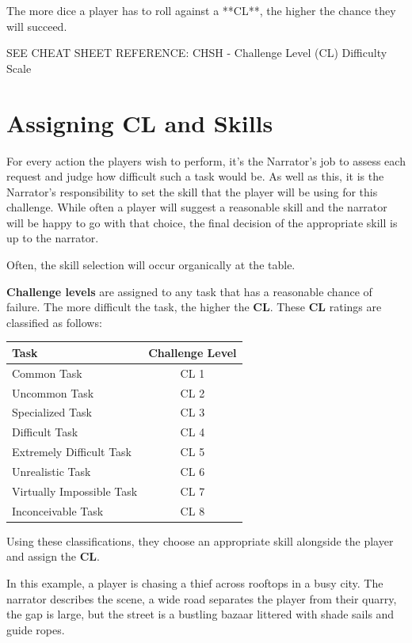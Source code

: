 The more dice a player has to roll against a **CL**, the higher the chance they will succeed.

SEE CHEAT SHEET REFERENCE: CHSH - Challenge Level (CL) Difficulty Scale

\section{Assigning CL and Skills} \label{sec:assigning_cl_and_skills}

For every action the players wish to perform, it’s the Narrator’s job to assess each request and judge how difficult such a task would be. As well as this, it is the Narrator’s responsibility to set the skill that the player will be using for this challenge. While often a player will suggest a reasonable skill and the narrator will be happy to go with that choice, the final decision of the appropriate skill is up to the narrator.  

Often, the skill selection will occur organically at the table.

\textbf{Challenge levels} are assigned to any task that has a reasonable chance of failure. The more difficult the task, the higher the \textbf{CL}. These \textbf{CL} ratings are classified as follows:

\begin{center}
    \begin{xltabular}{0.5\textwidth}{|l|c|} 
        \hline 
        \textbf{Task} & \textbf{Challenge Level} \\ 
        \hline
        Common Task & CL 1 \\
        Uncommon Task & CL 2 \\
        Specialized Task & CL 3 \\
        Difficult Task & CL 4 \\
        Extremely Difficult Task & CL 5 \\
        Unrealistic Task & CL 6 \\
        Virtually Impossible Task & CL 7 \\
        Inconceivable Task & CL 8 \\
        \hline
    \end{xltabular}
\end{center}

Using these classifications, they choose an appropriate skill alongside the player and assign the \textbf{CL}.

In this example, a player is chasing a thief across rooftops in a busy city. The narrator describes the scene, a wide road separates the player from their quarry, the gap is large, but the street is a bustling bazaar littered with shade sails and guide ropes.

